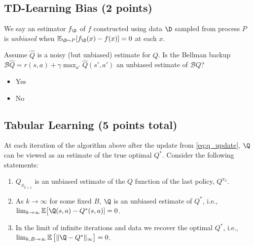 \def\makecols#1#2{{\def\p{#2}\newcount\i\i0\hfill\loop\advance\i1\makebox[1cm][c]{\expandafter\p\the\i}\kern.5cm\ifnum\i<#1\repeat\kern-1cm}}
\def\heading#1{\bf\expandafter\uppercase\expandafter{\romannumeral#1.}}
\def\boxes#1{\ensuremath\square}
\def\filled#1#2|#3{\ifnum#1=#3\ensuremath\blacksquare
	\else\if\relax#2\relax\ensuremath\square
	\else\filled#2|#3\fi\fi}
\def\ncol{3}
\newcommand{\checkeditem}[2]{\edef\x{0#1}\item[\expandafter\filled\x|#2]}


\def\choices#1#2{
	\begin{enumerate}
	\item on-policy in tabular setting \makecols\ncol{\filled0#1|}
	\item off-policy in tabular setting \makecols\ncol{\filled0#2|}
	\end{enumerate}
}

\subsection{TD-Learning Bias (2 points)}
\label{q:td_bias}

\def\answer{} %
\ifsolutions\solve\thesubsection\fi
We say an estimator $f_\D$ of $f$ constructed using data $\D$ sampled from process $P$ is \textit{unbiased} when $\mathbb{E}_{\D\sim P}[f_\D(x)-f(x)]=0$ at each $x$.

Assume $\hat Q$ is a noisy (but unbiased) estimate for $Q$. Is the Bellman backup $\mathcal{B}\hat Q = r(s, a) + \gamma \max_{a'} \hat Q(s', a')$ an unbiased estimate of $\mathcal{B}Q$?
\begin{itemize}
    \checkeditem\answer1 Yes
    \checkeditem\answer2 No
\end{itemize}

\subsection{Tabular Learning (5 points total)}
\label{q:tabular_learning}

At each iteration of the algorithm above after the update from \cref{eq:q_update}, $\Q$ can be viewed as an estimate of the true optimal $Q^*$. Consider the following statements: 
\begin{enumerate}[label=\bf\Roman*.]
  \item $Q_{\phi_{k+1}}$ is an unbiased estimate of the $Q$ function of the last policy, $Q^{\pi_k}$.
  \item As $k\to\infty$ for some fixed $B$, $\Q$ is an unbiased estimate of $Q^*$, i.e., $\lim_{k\to\infty} \mathbb{E}\bigl[\Q(s,a)-Q^*(s,a)]=0$.
  \item In the limit of infinite iterations and data we recover the optimal $Q^*$, i.e., $\lim_{k,B\to\infty}\mathbb{E}\,\bigl[\|\Q-Q^*\|_\infty\bigr]=0$.
\end{enumerate}

